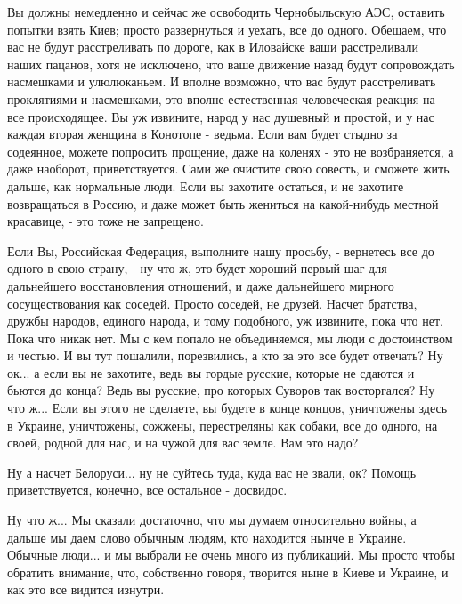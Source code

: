 Вы должны немедленно и сейчас же освободить Чернобыльскую АЭС, оставить попытки взять Киев; просто
развернуться и уехать, все до одного. Обещаем, что вас не будут расстреливать
по дороге, как в Иловайске ваши расстреливали наших пацанов, хотя не исключено,
что ваше движение назад будут сопровождать насмешками и улюлюканьем. И вполне
возможно, что вас будут расстреливать проклятиями и насмешками, это вполне
естественная человеческая реакция на все происходящее. Вы уж извините, народ у
нас душевный и простой, и у нас каждая вторая женщина в Конотопе - ведьма. Если
вам будет стыдно за содеянное, можете попросить прощение, даже на коленях - это
не возбраняется, а даже наоборот, приветствуется. Сами же очистите свою
совесть, и сможете жить дальше, как нормальные люди. Если вы захотите остаться,
и не захотите возвращаться в Россию, и даже может быть жениться на какой-нибудь
местной красавице, - это тоже не запрещено.

Если Вы, Российская Федерация, выполните нашу просьбу, - вернетесь все до
одного в свою страну, - ну что ж, это будет хороший первый шаг для дальнейшего
восстановления отношений, и даже дальнейшего мирного сосуществования как соседей. Просто соседей, не
друзей. Насчет братства, дружбы народов, единого народа, и тому подобного, уж
извините, пока что нет.  Пока что никак нет. Мы с кем попало не объединяемся,
мы люди с достоинством и честью. И вы тут пошалили, порезвились, а кто за это
все будет отвечать? Ну ок... а если вы не захотите, ведь вы гордые русские,
которые не сдаются и бьются до конца? Ведь вы русские, про которых Суворов так
восторгался? Ну что ж...  Если вы этого не сделаете, вы будете в конце концов,
уничтожены здесь в Украине, уничтожены, сожжены, перестреляны как собаки, все
до одного, на своей, родной для нас, и на чужой для вас земле. Вам это надо?

Ну а насчет Белоруси... ну не суйтесь туда, куда вас не звали, ок? Помощь
приветствуется, конечно, все остальное - досвидос.

Ну что ж... Мы сказали достаточно, что мы думаем относительно войны, а дальше
мы даем слово обычным людям, кто находится нынче в Украине. Обычные люди... и мы
выбрали не очень много из публикаций. Мы просто чтобы обратить внимание, что,
собственно говоря, творится ныне в Киеве и Украине, и как это все видится изнутри.
